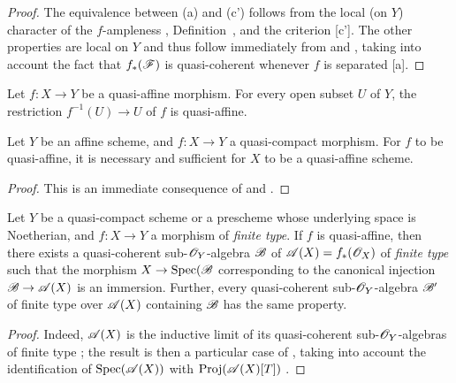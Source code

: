 \begin{proof}
\label{proof-2.5.1.6}
The equivalence between (a) and (c') follows from the local (on $Y$) character of the $f$-ampleness , Definition~, and the criterion [c'].
The other properties are local on $Y$
and thus follow immediately from  and , taking into account the fact that $f_*(\mathscr{F})$ is quasi-coherent whenever $f$ is separated [a].
\end{proof}

\begin{cor}[5.1.7]
\label{2.5.1.7}
Let $f:X\to Y$ be a quasi-affine morphism.
For every open subset $U$ of $Y$, the restriction $f^{-1}(U)\to U$ of $f$ is quasi-affine.
\end{cor}

\begin{cor}[5.1.8]
\label{2.5.1.8}
Let $Y$ be an affine scheme, and $f:X\to Y$ a quasi-compact morphism.
For $f$ to be quasi-affine, it is necessary and sufficient for $X$ to be a quasi-affine scheme.
\end{cor}

\begin{proof}
\label{proof-2.5.1.8}
This is an immediate consequence of  and .
\end{proof}

\begin{cor}[5.1.9]
\label{2.5.1.9}
Let $Y$ be a quasi-compact scheme or a prescheme whose underlying space is Noetherian, and $f:X\to Y$ a morphism of \emph{finite type}.
If $f$ is quasi-affine, then there exists a quasi-coherent sub-$\mathscr{O}_Y$-algebra $\mathscr{B}$ of $\mathscr{A}(X)=f_*(\mathscr{O}_X)$ of \emph{finite type}  such that the morphism $X\to\Spec(\sh{B}$ corresponding to the canonical injection $\sh{B}\to\sh{A}(X)$ is an immersion.
Further, every quasi-coherent sub-$\mathscr{O}_Y$-algebra $\mathscr{B}'$ of finite type over $\mathscr{A}(X)$ containing $\mathscr{B}$ has the same property.
\end{cor}

\begin{proof}
\label{proof-2.5.1.9}
Indeed, $\mathscr{A}(X)$ is the inductive limit of its quasi-coherent sub-$\mathscr{O}_Y$-algebras of finite type ;
the result is then a particular case of , taking into account the identification of ${\mathop{\mathrm{Spec}}\nolimits}(\mathscr{A}(X))$ with ${\mathop{\mathrm{Proj}}\nolimits}(\mathscr{A}(X)[T])$ .
\end{proof}

